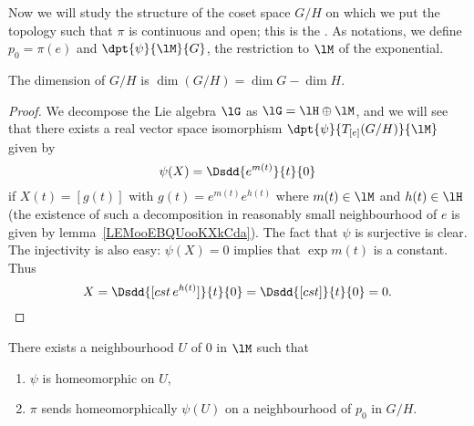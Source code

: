 Now we will study the structure of the coset space $G/H$ on which we put the topology such that $\pi$ is continuous and open; this is the \label{pg:natur_topo}. As notations, we define $p_0=\pi(e)$ and $\dpt{\psi}{\lM}{G}$, the restriction to $\lM$ of the exponential.

\begin{lemma}
	The dimension of $G/H$ is $\dim (G/H)=\dim G-\dim H$.
	\label{lem:dim_G_H}
\end{lemma}

\begin{proof}
	We decompose the Lie algebra $\lG$ as $\lG=\lH\oplus\lM$, and we will see that there exists a real vector space isomorphism $\dpt{\psi}{T_{[e]}(G/H)}{\lM}$ given by
	\begin{equation}
		\psi(X)=\Dsdd{ e^{m(t)} }{t}{0}
	\end{equation}
	if $X(t)=[g(t)]$ with $g(t)=e^{m(t)}e^{h(t)}$ where $m(t)\in\lM$ and $h(t)\in\lH$ (the existence of such a decomposition in reasonably small neighbourhood of $e$ is given by lemma~\ref{LEMooEBQUooKXkCda}). The fact that $\psi$ is surjective is clear. The injectivity is also easy: $\psi(X)=0$ implies that $\exp m(t)$ is a constant. Thus
	\[
		X=\Dsdd{ [cst\, e^{h(t)}] }{t}{0}=\Dsdd{[cst]}{t}{0}=0.
	\]

\end{proof}

\begin{lemma} \label{lem:vois_U}
	There exists a neighbourhood $U$ of $0$ in $\lM$ such that
	\begin{enumerate}
		\item $\psi$ is homeomorphic on $U$,
		\item $\pi$ sends homeomorphically $\psi(U)$ on a neighbourhood of $p_0$ in $G/H$.
	\end{enumerate}
\end{lemma}


